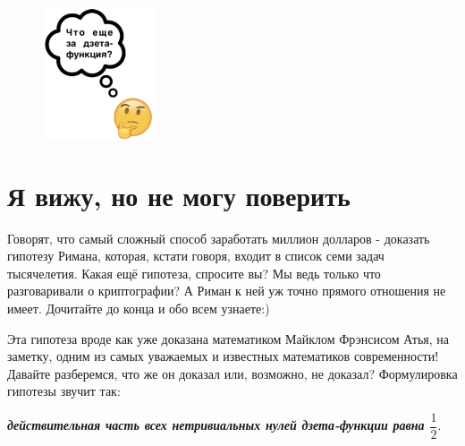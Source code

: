 \newline \hspace{20}
\begin{figure}
 \vspace{-50pt}
  \begin{center}
    \includegraphics[width=0.3\textwidth]{emoji.png}
  \end{center}
   \vspace{-90pt}
\end{figure}

\section{Я вижу, но не могу поверить}

\newline \hspace{20} Говорят, что самый сложный способ заработать миллион долларов - доказать гипотезу Римана, которая, кстати говоря, входит в список семи задач тысячелетия. Какая ещё гипотеза, спросите вы? Мы ведь только что разговаривали о криптографии? А Риман к ней уж точно прямого отношения не имеет. Дочитайте до конца и обо всем узнаете:)
\newpage



\newline \hspace{20}



\newline \hspace{20}Эта гипотеза вроде как уже доказана математиком Майклом Фрэнсисом Атья, на заметку, одним из самых уважаемых и известных математиков современности! Давайте разберемся, что же он доказал или, возможно, не доказал?
Формулировка гипотезы звучит так:\\
\centerline{\textbf{\textit{действительная часть всех нетривиальных нулей дзета-функции равна $\dfrac{1}{2}$}}.} 

